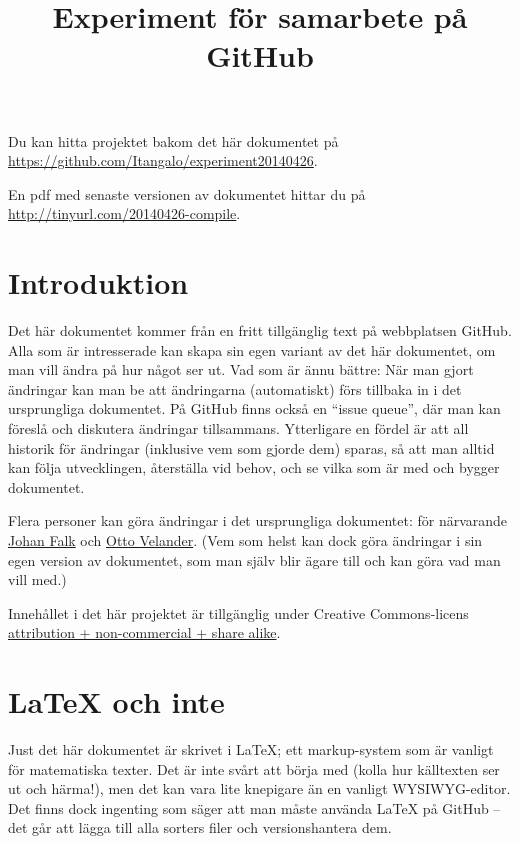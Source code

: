 \documentclass[12pt]{article}
\title{Experiment för samarbete på GitHub}
\date{}
\begin{document}
  \maketitle
  
  Du kan hitta projektet bakom det här dokumentet på \url{https://github.com/Itangalo/experiment20140426}.
  
  En pdf med senaste versionen av dokumentet hittar du på \url{http://tinyurl.com/20140426-compile}.
  
  \section{Introduktion}
  Det här dokumentet kommer från en fritt tillgänglig text på webbplatsen GitHub.
  Alla som är intresserade kan skapa sin egen variant av det här dokumentet, om man vill ändra på hur något ser ut.
  Vad som är ännu bättre: När man gjort ändringar kan man be att ändringarna (automatiskt) förs tillbaka in i det ursprungliga dokumentet.
  På GitHub finns också en ``issue queue'', där man kan föreslå och diskutera ändringar tillsammans.
  Ytterligare en fördel är att all historik för ändringar (inklusive vem som gjorde dem) sparas, så att man alltid kan följa utvecklingen, återställa vid behov, och se vilka som är med och bygger dokumentet.
  
  Flera personer kan göra ändringar i det ursprungliga dokumentet: för närvarande \href{https://github.com/Itangalo}{Johan Falk} och \href{https://github.com/ottve507}{Otto Velander}.
  (Vem som helst kan dock göra ändringar i sin egen version av dokumentet, som man själv blir ägare till och kan göra vad man vill med.)
  
  Innehållet i det här projektet är tillgänglig under Creative Commons-licens \href{http://creativecommons.org/licenses/by-nc-sa/3.0/}{attribution + non-commercial + share alike}.

  \section{LaTeX och inte}
  Just det här dokumentet är skrivet i LaTeX; ett markup-system som är vanligt för matematiska texter.
  Det är inte svårt att börja med (kolla hur källtexten ser ut och härma!), men det kan vara lite knepigare än en vanligt WYSIWYG-editor.
  Det finns dock ingenting som säger att man måste använda LaTeX på GitHub -- det går att lägga till alla sorters filer och versionshantera dem.

  
  
  
\end{document}
